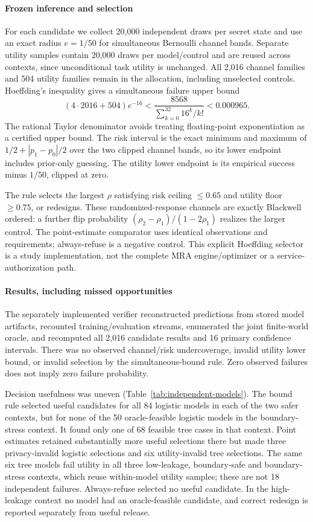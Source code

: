 \paragraph{Frozen inference and selection}
For each candidate we collect 20,000 independent draws per secret state and
use an exact radius $e=1/50$ for simultaneous Bernoulli channel bands.
Separate utility samples contain 20,000 draws per model/control and are
reused across contexts, since unconditional task utility is unchanged.
All 2,016 channel families and 504 utility families remain in the allocation,
including unselected controls. Hoeffding's inequality \citep{hoeffding1963bounded}
gives a simultaneous failure upper bound
\[
 (4\cdot2016+504)e^{-16}
 <\frac{8568}{\sum_{k=0}^{32}16^k/k!}<0.000965.
\]
The rational Taylor denominator avoids treating floating-point exponentiation
as a certified upper bound. The risk interval is the exact minimum and maximum
of $1/2+|p_1-p_0|/2$ over the two clipped channel bands, so its lower endpoint
includes prior-only guessing. The utility lower endpoint is its empirical
success minus $1/50$, clipped at zero.

The rule selects the largest $\rho$ satisfying risk ceiling $\le0.65$ and
utility floor $\ge0.75$, or redesigns. These randomized-response channels
are exactly Blackwell ordered: a further flip probability
$(\rho_2-\rho_1)/(1-2\rho_1)$ realizes the larger control. The point-estimate
comparator uses identical observations and requirements; always-refuse is a
negative control. This explicit Hoeffding selector is a study implementation,
not the complete MRA engine/optimizer or a service-authorization path.



\paragraph{Results, including missed opportunities}
The separately implemented verifier reconstructed predictions from stored model artifacts,
recounted training/evaluation streams, enumerated the joint finite-world oracle,
and recomputed all 2,016 candidate results and 16 primary confidence intervals.
There was no observed channel/risk undercoverage, invalid utility lower bound,
or invalid selection by the simultaneous-bound rule. Zero observed failures
does not imply zero failure probability.

Decision usefulness was uneven (Table~\ref{tab:independent-models}). The bound
rule selected useful candidates for all 84 logistic models in each of the two
safer contexts, but for none of the 50 oracle-feasible logistic models in the
boundary-stress context. It found only one of 68 feasible tree cases in that
context. Point estimates retained substantially more useful selections there
but made three privacy-invalid logistic selections and six utility-invalid
tree selections. The same six tree models fail utility in all three low-leakage,
boundary-safe and boundary-stress contexts, which reuse within-model utility
samples; these are not 18 independent failures. Always-refuse selected no
useful candidate. In the high-leakage
context no model had an oracle-feasible candidate, and correct redesign is
reported separately from useful release.

